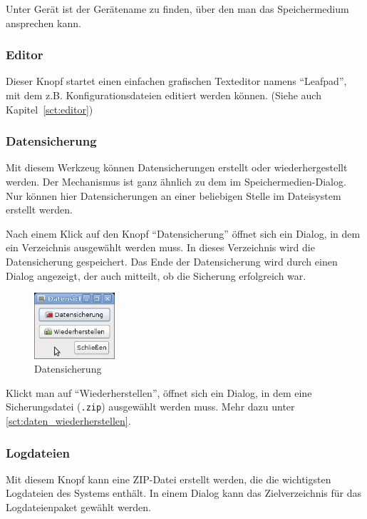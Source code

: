\documentclass[a4paper,12pt,twoside]{article}
\begin{document}
Unter Gerät ist der Gerätename zu finden, über den man das
Speichermedium ansprechen kann.


\subsubsection{Editor}
\label{sct:gui_editor}
Dieser Knopf startet einen einfachen
grafischen Texteditor namens "`Leafpad"', mit
dem z.B. Konfigurationsdateien editiert werden können. (Siehe auch
Kapitel~\ref{sct:editor})


\subsubsection{Datensicherung}
\label{sct:dialog_datensicherung}
Mit diesem Werkzeug können
Datensicherungen erstellt oder wiederhergestellt werden. Der
Mechanismus ist ganz ähnlich zu dem im Speichermedien-Dialog. Nur
können hier Datensicherungen an einer beliebigen Stelle im Dateisystem
erstellt werden.

Nach einem Klick auf den Knopf
"`Datensicherung"' öffnet sich ein Dialog, in
dem ein Verzeichnis ausgewählt werden muss. In dieses Verzeichnis wird
die Datensicherung gespeichert. Das Ende der Datensicherung wird durch
einen Dialog angezeigt, der auch mitteilt, ob die Sicherung erfolgreich
war.

\begin{figure}
    \centering
    \includegraphics[width=3cm]{screenshots/efaLivede-img21.png}
    \caption{Datensicherung}
    \label{fig:dialog_datensicherung}
\end{figure}

Klickt man auf "`Wiederherstellen"', öffnet
sich ein Dialog, in dem eine Sicherungsdatei (\texttt{.zip})
ausgewählt werden muss. Mehr dazu unter \ref{sct:daten_wiederherstellen}.


\subsubsection{Logdateien}
\label{sct:logfiles}
Mit diesem Knopf kann eine ZIP-Datei erstellt werden, die die wichtigsten
Logdateien des Systems enthält. In einem Dialog kann das Zielverzeichnis 
für das Logdateienpaket gewählt werden.
\end{document}
